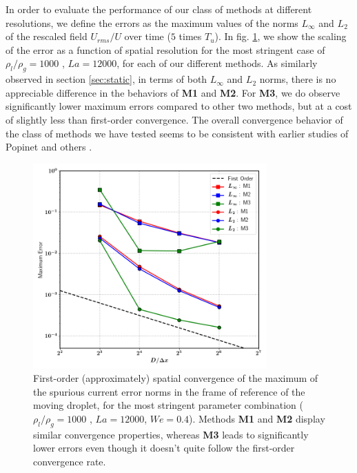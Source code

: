 In order to evaluate the performance of our class of methods at different resolutions, we define the errors as the maximum values of the norms $L_\infty$ and $L_2$ of the rescaled field $U_{rms}/U$ over time ($5$ times $T_u$). In fig. \ref{moving_drop_conv}, we show the scaling of the error as a function of spatial resolution for the most stringent case of $\rho_l/\rho_g = 1000 $ , $La = 12000$, for each of our different methods. As similarly observed in section \ref{sec:static}, in terms of both $L_\infty$ and $L_2$ norms, there is no appreciable difference in the behaviors of \textbf{M1} and \textbf{M2}. For \textbf{M3}, we do observe significantly lower maximum errors compared to other two methods, but at a cost of slightly less than first-order convergence. The overall convergence behavior of the class of methods we have tested seems to be consistent with earlier studies of Popinet \cite{popinet2009accurate} and others  .  

\begin{figure}[h!]
    \centering
    \includegraphics[width = 0.8\textwidth]{plots/droplet_advect/convergence_all.png}
	\caption{First-order (approximately) spatial convergence of the maximum of the spurious current error norms in the frame of reference of the moving droplet, for the most stringent parameter combination ($\rho_l/\rho_g = 1000 $ , $La = 12000$, $We = 0.4$). Methods \textbf{M1} and \textbf{M2} display similar convergence properties, whereas \textbf{M3} leads to significantly lower errors even though it doesn't quite follow the first-order convergence rate. }   
    \label{moving_drop_conv}
\end{figure}

